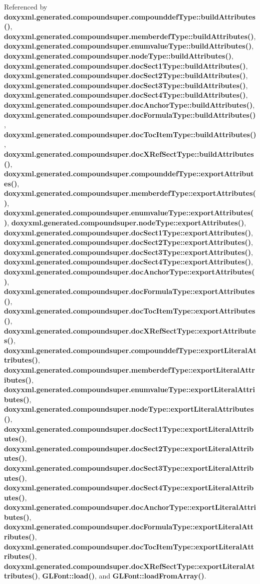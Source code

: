 Referenced by {\bf doxyxml.\+generated.\+compoundsuper.\+compounddef\+Type\+::build\+Attributes()}, {\bf doxyxml.\+generated.\+compoundsuper.\+memberdef\+Type\+::build\+Attributes()}, {\bf doxyxml.\+generated.\+compoundsuper.\+enumvalue\+Type\+::build\+Attributes()}, {\bf doxyxml.\+generated.\+compoundsuper.\+node\+Type\+::build\+Attributes()}, {\bf doxyxml.\+generated.\+compoundsuper.\+doc\+Sect1\+Type\+::build\+Attributes()}, {\bf doxyxml.\+generated.\+compoundsuper.\+doc\+Sect2\+Type\+::build\+Attributes()}, {\bf doxyxml.\+generated.\+compoundsuper.\+doc\+Sect3\+Type\+::build\+Attributes()}, {\bf doxyxml.\+generated.\+compoundsuper.\+doc\+Sect4\+Type\+::build\+Attributes()}, {\bf doxyxml.\+generated.\+compoundsuper.\+doc\+Anchor\+Type\+::build\+Attributes()}, {\bf doxyxml.\+generated.\+compoundsuper.\+doc\+Formula\+Type\+::build\+Attributes()}, {\bf doxyxml.\+generated.\+compoundsuper.\+doc\+Toc\+Item\+Type\+::build\+Attributes()}, {\bf doxyxml.\+generated.\+compoundsuper.\+doc\+X\+Ref\+Sect\+Type\+::build\+Attributes()}, {\bf doxyxml.\+generated.\+compoundsuper.\+compounddef\+Type\+::export\+Attributes()}, {\bf doxyxml.\+generated.\+compoundsuper.\+memberdef\+Type\+::export\+Attributes()}, {\bf doxyxml.\+generated.\+compoundsuper.\+enumvalue\+Type\+::export\+Attributes()}, {\bf doxyxml.\+generated.\+compoundsuper.\+node\+Type\+::export\+Attributes()}, {\bf doxyxml.\+generated.\+compoundsuper.\+doc\+Sect1\+Type\+::export\+Attributes()}, {\bf doxyxml.\+generated.\+compoundsuper.\+doc\+Sect2\+Type\+::export\+Attributes()}, {\bf doxyxml.\+generated.\+compoundsuper.\+doc\+Sect3\+Type\+::export\+Attributes()}, {\bf doxyxml.\+generated.\+compoundsuper.\+doc\+Sect4\+Type\+::export\+Attributes()}, {\bf doxyxml.\+generated.\+compoundsuper.\+doc\+Anchor\+Type\+::export\+Attributes()}, {\bf doxyxml.\+generated.\+compoundsuper.\+doc\+Formula\+Type\+::export\+Attributes()}, {\bf doxyxml.\+generated.\+compoundsuper.\+doc\+Toc\+Item\+Type\+::export\+Attributes()}, {\bf doxyxml.\+generated.\+compoundsuper.\+doc\+X\+Ref\+Sect\+Type\+::export\+Attributes()}, {\bf doxyxml.\+generated.\+compoundsuper.\+compounddef\+Type\+::export\+Literal\+Attributes()}, {\bf doxyxml.\+generated.\+compoundsuper.\+memberdef\+Type\+::export\+Literal\+Attributes()}, {\bf doxyxml.\+generated.\+compoundsuper.\+enumvalue\+Type\+::export\+Literal\+Attributes()}, {\bf doxyxml.\+generated.\+compoundsuper.\+node\+Type\+::export\+Literal\+Attributes()}, {\bf doxyxml.\+generated.\+compoundsuper.\+doc\+Sect1\+Type\+::export\+Literal\+Attributes()}, {\bf doxyxml.\+generated.\+compoundsuper.\+doc\+Sect2\+Type\+::export\+Literal\+Attributes()}, {\bf doxyxml.\+generated.\+compoundsuper.\+doc\+Sect3\+Type\+::export\+Literal\+Attributes()}, {\bf doxyxml.\+generated.\+compoundsuper.\+doc\+Sect4\+Type\+::export\+Literal\+Attributes()}, {\bf doxyxml.\+generated.\+compoundsuper.\+doc\+Anchor\+Type\+::export\+Literal\+Attributes()}, {\bf doxyxml.\+generated.\+compoundsuper.\+doc\+Formula\+Type\+::export\+Literal\+Attributes()}, {\bf doxyxml.\+generated.\+compoundsuper.\+doc\+Toc\+Item\+Type\+::export\+Literal\+Attributes()}, {\bf doxyxml.\+generated.\+compoundsuper.\+doc\+X\+Ref\+Sect\+Type\+::export\+Literal\+Attributes()}, {\bf G\+L\+Font\+::load()}, and {\bf G\+L\+Font\+::load\+From\+Array()}.

